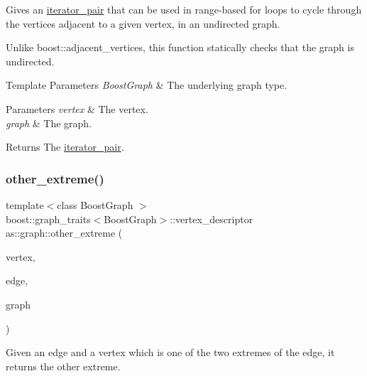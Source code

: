 Gives an \hyperlink{classas_1_1iterator__pair}{iterator\+\_\+pair} that can be used in range-\/based for loops to cycle through the vertices adjacent to a given vertex, in an undirected graph. 

Unlike boost\+::adjacent\+\_\+vertices, this function statically checks that the graph is undirected.


\begin{DoxyTemplParams}{Template Parameters}
{\em Boost\+Graph} & The underlying graph type. \\
\hline
\end{DoxyTemplParams}

\begin{DoxyParams}{Parameters}
{\em vertex} & The vertex. \\
\hline
{\em graph} & The graph. \\
\hline
\end{DoxyParams}
\begin{DoxyReturn}{Returns}
The \hyperlink{classas_1_1iterator__pair}{iterator\+\_\+pair}. 
\end{DoxyReturn}
\mbox{\label{namespaceas_1_1graph_a592c192d63c1c42820da78708adb9e61}} 
\subsubsection{\texorpdfstring{other\+\_\+extreme()}{other\_extreme()}}
{\footnotesize\ttfamily template$<$class Boost\+Graph $>$ \\
boost\+::graph\+\_\+traits$<$Boost\+Graph$>$\+::vertex\+\_\+descriptor as\+::graph\+::other\+\_\+extreme (\begin{DoxyParamCaption}\item[{const typename boost\+::graph\+\_\+traits$<$ Boost\+Graph $>$\+::vertex\+\_\+descriptor \&}]{vertex,  }\item[{const typename boost\+::graph\+\_\+traits$<$ Boost\+Graph $>$\+::edge\+\_\+descriptor \&}]{edge,  }\item[{const Boost\+Graph \&}]{graph }\end{DoxyParamCaption})\hspace{0.3cm}{\ttfamily [inline]}}



Given an edge and a vertex which is one of the two extremes of the edge, it returns the other extreme. 


